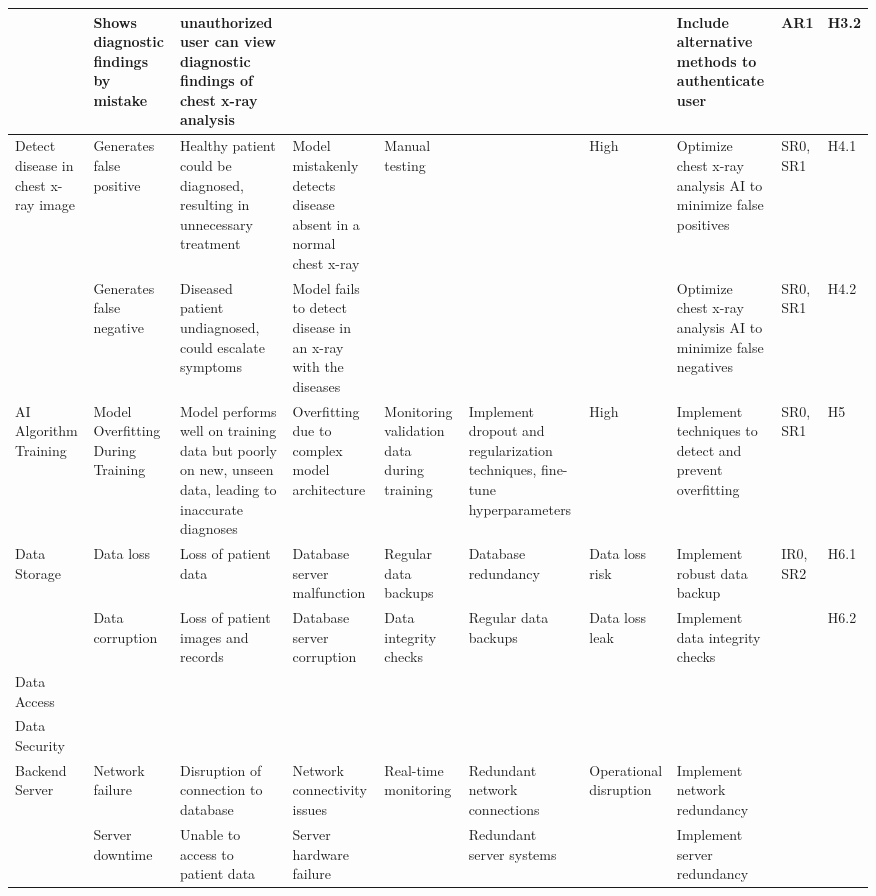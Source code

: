 \documentclass{article}
\begin{document}
\begin{landscape}
\begin{table}[hp]
\begin{footnotesize}
\begin{tabular}{|p{1in}|p{1in}|p{1in}|p{1.5in}|p{0.6in}|p{0.5in}|p{0.3in}|p{2.5in}|p{0.2in}|p{0.2in}|}
        \cline{2-3}\cline{8-10}
        & Shows diagnostic findings by mistake & unauthorized user can view diagnostic findings of chest x-ray analysis & & & & & Include alternative methods to authenticate user & AR1 & H3.2 \\
        \hline
        \multirow{2}{1in}{Detect disease in chest x-ray image} & Generates false positive & Healthy patient could be diagnosed, resulting in unnecessary treatment & Model mistakenly detects disease absent in a normal chest x-ray & \multirow{2}{0.6in}{Manual testing} & & \multirow{2}{0.3in}{High} & Optimize chest x-ray analysis AI to minimize false positives & SR0, SR1 & H4.1 \\
        \cline{2-4}\cline{8-10}
        & Generates false negative & Diseased patient undiagnosed, could escalate symptoms & Model fails to detect disease in an x-ray with the diseases & & & & Optimize chest x-ray analysis AI to minimize false negatives & SR0, SR1 & H4.2 \\
        \hline
        AI Algorithm Training & Model Overfitting During Training & Model performs well on training data but poorly on new, unseen data, leading to inaccurate diagnoses & Overfitting due to complex model architecture & Monitoring validation data during training & Implement dropout and regularization techniques, fine-tune hyperparameters & High & Implement techniques to detect and prevent overfitting & SR0, SR1 & H5 \\
        \hline
        \multirow{2}{1in}{Data Storage} & Data loss & Loss of patient data & Database server malfunction & Regular data backups & Database redundancy & Data loss risk & Implement robust data backup & \multirow{2}{0.2in}{IR0, SR2} & H6.1 \\
        \cline{2-8}\cline{10-10}
        & Data corruption & Loss of patient images and records & Database server corruption & Data integrity checks & Regular data backups & Data loss leak & Implement data integrity checks & & H6.2 \\
        \hline
        Data Access & & & & & & & & & \\
        \hline
        Data Security & & & & & & & & & \\
        \hline
        \multirow{2}{1in}{Backend Server} & Network failure & Disruption of connection to database & Network connectivity issues & \multirow{2}{0.6in}{Real-time monitoring} & Redundant network connections & \multirow{2}{0.2in}{Operational disruption} & Implement network redundancy & & \\
        \cline{2-4}\cline{6-6}\cline{8-8}
        & Server downtime & Unable to access to patient data & Server hardware failure & & Redundant server systems & & Implement server redundancy & & \\
        \bottomrule
    \end{tabular}
    \end{footnotesize}
\end{table}
\end{landscape}
\restoregeometry
\end{document}
